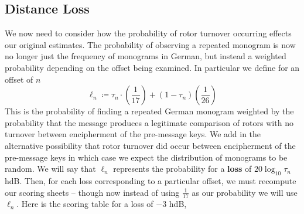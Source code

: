   \subsection{Distance Loss}
  We now need to consider how the probability of rotor turnover
  occurring effects our original estimates. The probability of
  observing a repeated monogram is now no longer just the frequency
  of monograms in German, but instead a weighted probability
  depending on the offset being examined. In particular we define for
  an offset of $n$
  \[
    \ell_n \coloneq \tau_n\cdot(\frac{1}{17}) + (1-\tau_n)(\frac{1}{26})
  \]
  This is the probability of finding a repeated German monogram
  weighted by the probability that the message produces a legitimate
  comparison of rotors with no turnover between encipherment of the
  pre-message keys. We add in the alternative possibility that rotor
  turnover did occur between encipherment of the pre-message keys in
  which case we expect the distribution of monograms to be random. We
  will say that $\ell_n$ represents the probability for a {\bf{loss}}
  of $20\log_{10}{\tau_n}$ hdB. Then, for each loss corresponding to
  a particular offset, we must recompute our scoring sheets -- though
  now instead of using $\frac{1}{17}$ as our probability we will use
  $\ell_n$. Here is the scoring table for a loss of $-3$ hdB,
